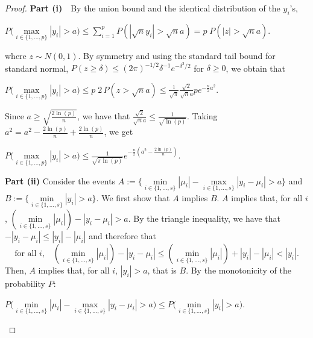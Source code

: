 \documentclass[bj,authoryear]{imsart}
\theoremstyle{plain}
\begin{document}
\begin{proof}

\textbf{Part (i)} \,\, By the union bound and the identical distribution of the $y_i$'s,
\begin{center}
    $P\Big(\underset{i\in\{1,\ldots,p\}}{\max}|y_i|> a \Big)     \leq \sum_{i=1}^{p}{ P\left(|\sqrt{n}y_i|>\sqrt{n}a \right)}
    = p\; P\left(|z|>\sqrt{n}a\right).$
\end{center}
    where $z\sim N(0,1)$. 
    By symmetry and using the standard tail bound for standard normal, $P(z \geq \delta) \leq (2\pi)^{-1/2} \delta^{-1} e^{-\delta^{2} / 2}$ for $\delta \geq 0$, we obtain that 
\begin{center}
  $P\Big(\underset{i\in\{1,\ldots,p\}}{\max}|y_i|> a \Big) 
     \leq  p\; 2 \, P\left(z>\sqrt{n}a\right) \leq \frac{1}{\sqrt{\pi}}\frac{\sqrt{2}}{\sqrt{n}a}p e^{-\frac{n}{2} a^{2}}.$
\end{center}
Since $a \geq \sqrt{\frac{2\ln(p)}{n}}$, we have that $\frac{\sqrt{2}}{\sqrt{n}a}\leq \frac{1}{\sqrt{\ln(p)}}$. Taking $a^2=a^2-\frac{2\ln(p)}{n}+\frac{2\ln(p)}{n}$, we get \begin{center}
$ P\Big(\underset{i\in\{1,\ldots,p\}}{\max}|y_i|> a \Big) \leq \frac{1}{\sqrt{\pi\ln(p)}} e^{-\frac{n}{2} \left(a^{2}-\frac{2\ln(p)}{n}\right)}.$ \\\end{center}

\textbf{Part (ii)} Consider the events $A:=\{ \underset{i \in \{1,\ldots,s\}}{\min}|\mu_i|- \underset{i \in \{1,\ldots,s\}}{\max}|y_i-\mu_i| > a\}$ and $B:=\{\underset{i \in \{1,\ldots,s\}}{\min}|y_i| > a\}$. We first show that $A$ implies $B$. $A$ implies that, for all $i$, $(\underset{i \in \{1,\ldots,s\}}{\min}|\mu_i|) - |y_i-\mu_i| > a $.  By the triangle inequality, we have that $ -|y_i-\mu_i|\leq|y_i|-|\mu_i|$ and therefore that $$ \text{for all } i, \;\;\;(\min_{i \in \{1,\ldots,s\}}|\mu_i|) - |y_i-\mu_i| \leq  (\min_{i \in \{1,\ldots,s\}}|\mu_i|) +|y_i| - |\mu_i| < |y_i|.$$ 
Then, $A$ 
implies that, for all $i$, $|y_i| > a $, that is $B$. By the monotonicity of the probability $P$: 
\begin{center}$ P\Big(\underset{i \in \{1,\ldots,s\}}{\min}|\mu_i|-\underset{i \in \{1,\ldots,s\}}{\max}|y_i-\mu_i| > a\Big) \leq P\Big(\underset{i \in \{1,\ldots,s\}}{\min}|y_i| > a\Big) $. \end{center}



\end{proof}
\end{document}
